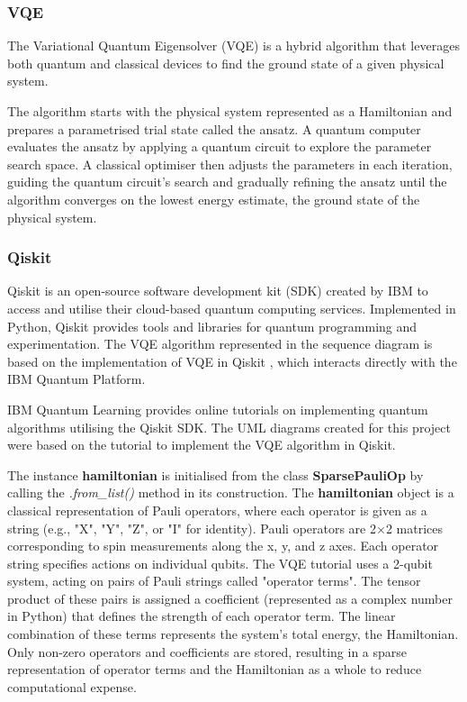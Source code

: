 \documentclass{article}
\newcounter{subsubsubsection}[subsubsection]
\begin{document}
\subsubsection{VQE}

The Variational Quantum Eigensolver (VQE) is a hybrid algorithm that leverages both quantum and classical devices to find the ground state of a given physical system. 

The algorithm starts with the physical system represented as a Hamiltonian and prepares a parametrised trial state called the ansatz. A quantum computer evaluates the ansatz by applying a quantum circuit to explore the parameter search space. A classical optimiser then adjusts the parameters in each iteration, guiding the quantum circuit’s search and gradually refining the ansatz until the algorithm converges on the lowest energy estimate, the ground state of the physical system.

\subsubsection{Qiskit}

Qiskit is an open-source software development kit (SDK) created by IBM to access and utilise their cloud-based quantum computing services. Implemented in Python, Qiskit provides tools and libraries for quantum programming and experimentation. The VQE algorithm represented in the sequence diagram is based on the implementation of VQE in Qiskit \cite{IBM2024}, which interacts directly with the IBM Quantum Platform.


IBM Quantum Learning provides online tutorials\cite{Tutorial} on implementing quantum algorithms utilising the Qiskit SDK. The UML diagrams created for this project were based on the tutorial to implement the VQE algorithm in Qiskit\cite{IBM2024}.

The instance \textbf{hamiltonian} is initialised from the class \textbf{SparsePauliOp} by calling the \textit{.from\_list()} method in its construction. The \textbf{hamiltonian} object is a classical representation of Pauli operators, where each operator is given as a string (e.g., "X", "Y", "Z", or "I" for identity). Pauli operators are 2×2 matrices corresponding to spin measurements along the x, y, and z axes\cite{DJORDJEVIC201229}. Each operator string specifies actions on individual qubits. The VQE tutorial uses a 2-qubit system, acting on pairs of Pauli strings called "operator terms". The tensor product of these pairs is assigned a coefficient (represented as a complex number in Python) that defines the strength of each operator term. The linear combination of these terms represents the system's total energy, the Hamiltonian. Only non-zero operators and coefficients are stored, resulting in a sparse representation of operator terms and the Hamiltonian as a whole to reduce computational expense.
\end{document}
